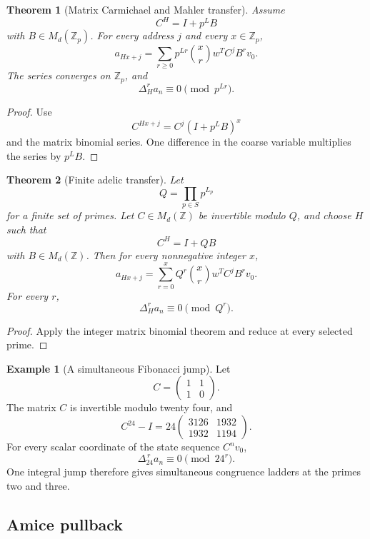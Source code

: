 \documentclass{aomart}
\newtheorem{theorem}{Theorem}[section]
\theoremstyle{definition}
\newtheorem{example}[example]{Example}
\theoremstyle{remark}
\newcommand{\ZZ}{\mathbb Z}
\newcommand{\Zp}{\mathbb Z_p}
\begin{document}
\begin{theorem}[Matrix Carmichael and Mahler transfer]\label{thm:matrix_carmichael_mahler}
Assume
\[
C^H=I+p^LB
\]
with \(B\in M_d(\Zp)\). For every address \(j\) and every \(x\in\Zp\),
\[
\boxed{
a_{Hx+j}
=
\sum_{r\geq0}
p^{Lr}\binom xr
w^TC^jB^rv_0.
}
\]
The series converges on \(\Zp\), and
\[
\boxed{
\Delta_H^ra_n
\equiv0
\pmod {p^{Lr}}.
}
\]
\end{theorem}

\begin{proof}
Use
\[
C^{Hx+j}=C^j(I+p^LB)^x
\]
and the matrix binomial series. One difference in the coarse variable multiplies the series by \(p^LB\).
\end{proof}

\begin{theorem}[Finite adelic transfer]\label{thm:finite_adelic_transfer}
Let
\[
Q=\prod_{p\in S}p^{L_p}
\]
for a finite set of primes. Let \(C\in M_d(\ZZ)\) be invertible modulo \(Q\), and choose \(H\) such that
\[
C^H=I+QB
\]
with \(B\in M_d(\ZZ)\). Then for every nonnegative integer \(x\),
\[
\boxed{
a_{Hx+j}
=
\sum_{r=0}^{x}Q^r\binom xr
w^TC^jB^rv_0.
}
\]
For every \(r\),
\[
\boxed{
\Delta_H^ra_n\equiv0\pmod {Q^r}.
}
\]
\end{theorem}

\begin{proof}
Apply the integer matrix binomial theorem and reduce at every selected prime.
\end{proof}

\begin{example}[A simultaneous Fibonacci jump]\label{ex:fibonacci_finite_adelic}
Let
\[
C=
\begin{pmatrix}
1&1\\
1&0
\end{pmatrix}.
\]
The matrix \(C\) is invertible modulo twenty four, and
\[
C^{24}-I
=
24
\begin{pmatrix}
3126&1932\\
1932&1194
\end{pmatrix}.
\]
For every scalar coordinate of the state sequence \(C^nv_0\),
\[
\boxed{
\Delta_{24}^{\,r}a_n
\equiv0
\pmod {24^r}.
}
\]
One integral jump therefore gives simultaneous congruence ladders at the primes two and three.
\end{example}

\subsection{Amice pullback}
\end{document}
